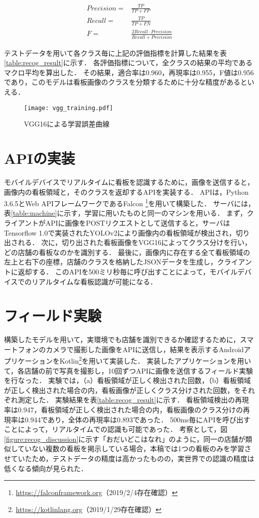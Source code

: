     \begin{align}
      Precision = &\frac{TP}{TP+FP} \\
      Recall = &\frac{TP}{TP+FN} \\
      F = &\frac{2 Recall \cdot Precision}{Recall + Precision}
    \end{align}
    
    テストデータを用いて各クラス毎に上記の評価指標を計算した結果を表\ref{table:recog_result}に示す．
    各評価指標について，全クラスの結果の平均であるマクロ平均を算出した．
    その結果，適合率は0.960，再現率は0.955，F値は0.956であり，このモデルは看板画像のクラスを分類するために十分な精度があるといえる．

    \begin{figure}[tb]
      \centerline{\texttt{[image: vgg\_training.pdf]}}
      \caption{VGG16による学習誤差曲線}
      \label{figure:vgg_training}
    \end{figure}

\section{APIの実装}
  モバイルデバイスでリアルタイムに看板を認識するために，画像を送信すると，画像内の看板領域と，そのクラスを返却するAPIを実装する．
  APIは，Python 3.6.5とWeb APIフレームワークであるFalcon \footnote{\url{https://falconframework.org}（2019/2/4存在確認）}を用いて構築した．
  サーバには，表\ref{table:machine}に示す，学習に用いたものと同一のマシンを用いる．
  まず，クライアントがAPIに画像をPOSTリクエストとして送信すると，サーバはTensorflow 1.0\cite{Abadi:2016}で実装されたYOLOv2により画像内の看板領域が検出され，切り出される．
  次に，切り出された看板画像をVGG16によってクラス分けを行い，どの店舗の看板なのかを識別する．
  最後に，画像内に存在する全て看板領域の左上と右下の座標，店舗のクラスを格納したJSONデータを生成し，クライアントに返却する．
  このAPIを500ミリ秒毎に呼び出すことによって，モバイルデバイスでのリアルタイムな看板認識が可能になる．

\section{フィールド実験}
  構築したモデルを用いて，実環境でも店舗を識別できるか確認するために，スマートフォンのカメラで撮影した画像をAPIに送信し，結果を表示するAndroidアプリケーションをKotlin\footnote{\url{https://kotlinlang.org}（2019/1/29存在確認）}を用いて実装した．
  実装したアプリケーションを用いて，各店舗の前で写真を撮影し，10回ずつAPIに画像を送信するフィールド実験を行なった．
  実験では，（a）看板領域が正しく検出された回数，（b）看板領域が正しく検出された場合の内，看板画像が正しくクラス分けされた回数，をそれぞれ測定した．
  実験結果を表\ref{table:recog_result}に示す．
  看板領域検出の再現率は0.947，看板領域が正しく検出された場合の内，看板画像のクラス分けの再現率は0.944であり，全体の再現率は0.893であった．
  500ms毎にAPIを呼び出すことによって，リアルタイムでの認識も可能であった．
  考察として，図\ref{figure:recog_discussion}に示す「おだいどこはなれ」のように，同一の店舗が類似していない複数の看板を掲示している場合，本稿では1つの看板のみを学習させていたため，テストデータの精度は高かったものの，実世界での認識の精度は低くなる傾向が見られた．

